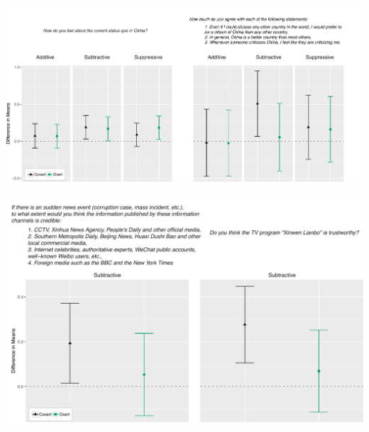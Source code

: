 \documentclass[11pt]{article}
\begin{document}
\begin{minipage}{\linewidth}
    \vspace{1em}
    \begin{center}
        \includegraphics[width=\textwidth]{figures/ATE_legitimacy_nat_performance.pdf}\\
        \label{ATE_legitimacy_nat_performance}
    \end{center}
    \vspace{1em}
\end{minipage}

\begin{minipage}{\linewidth}
    \vspace{1em}
    \begin{center}
        \includegraphics[width=.9\textwidth]{figures/ATE_media_trust.pdf}\\
        \label{ATE_media_trust}
    \end{center}
    \vspace{1em}
\end{minipage}
\end{document}
